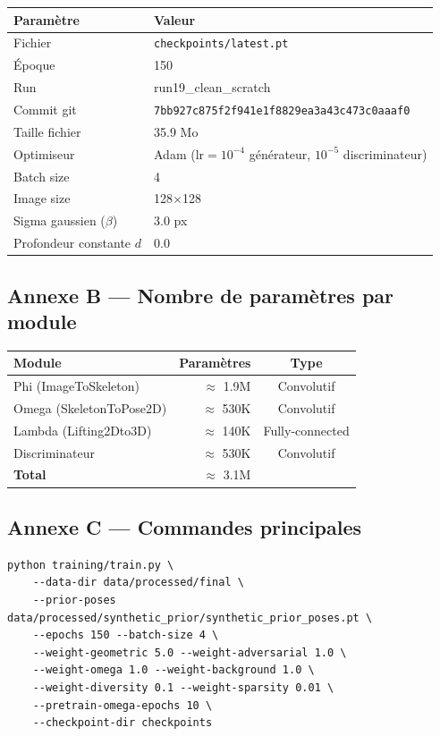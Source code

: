 \documentclass[12pt,a4paper]{article}
\begin{document}
\begin{center}
\begin{tabular}{ll}
\toprule
\textbf{Paramètre} & \textbf{Valeur} \\
\midrule
Fichier & \texttt{checkpoints/latest.pt} \\
Époque & 150 \\
Run & run19\_clean\_scratch \\
Commit git & \texttt{7bb927c875f2f941e1f8829ea3a43c473c0aaaf0} \\
Taille fichier & 35.9 Mo \\
Optimiseur & Adam ($\text{lr}=10^{-4}$ générateur, $10^{-5}$ discriminateur) \\
Batch size & 4 \\
Image size & 128$\times$128 \\
Sigma gaussien ($\beta$) & 3.0 px \\
Profondeur constante $d$ & 0.0 \\
\bottomrule
\end{tabular}
\end{center}

\subsection*{Annexe B --- Nombre de paramètres par module}

\begin{center}
\begin{tabular}{lrc}
\toprule
\textbf{Module} & \textbf{Paramètres} & \textbf{Type} \\
\midrule
Phi (ImageToSkeleton)   & $\approx$ 1.9M & Convolutif \\
Omega (SkeletonToPose2D)& $\approx$ 530K & Convolutif \\
Lambda (Lifting2Dto3D)  & $\approx$ 140K & Fully-connected \\
Discriminateur          & $\approx$ 530K & Convolutif \\
\midrule
\textbf{Total}          & $\approx$ 3.1M & \\
\bottomrule
\end{tabular}
\end{center}

\subsection*{Annexe C --- Commandes principales}

\begin{lstlisting}[style=python, caption={Entraînement principal}]
python training/train.py \
    --data-dir data/processed/final \
    --prior-poses data/processed/synthetic_prior/synthetic_prior_poses.pt \
    --epochs 150 --batch-size 4 \
    --weight-geometric 5.0 --weight-adversarial 1.0 \
    --weight-omega 1.0 --weight-background 1.0 \
    --weight-diversity 0.1 --weight-sparsity 0.01 \
    --pretrain-omega-epochs 10 \
    --checkpoint-dir checkpoints
\end{lstlisting}
\end{document}

